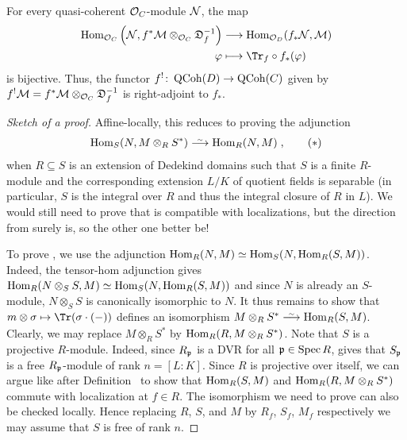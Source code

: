 \documentclass[a4paper,parskip=half,numbers=enddot, DIV=12]{scrreprt}
\begin{document}
\begin{prop}
	For every quasi-coherent $\mathcal{O}_C$-module $\mathcal{N}$, the map
	\begin{align}\lbl{eq:f^!adjunction}
		\begin{split}
			\Hom_{\Oo_C}\left(\Nn,f^*\Mm\otimes_{\Oo_C}\DD_f^{-1}\right)&\morphism\Hom_{\Oo_D}(f_*\Nn,\Mm)\\
			\phi&\longmapsto\Tr_f\circ f_*(\phi)
		\end{split}
	\end{align}
	is bijective. Thus, the functor $f^!\colon\cat{QCoh}(D)\morphism\cat{QCoh}(C)$ given by $f^!\mathcal{M}=f^*\mathcal{M}\otimes_{\mathcal{O}_C}\mathfrak{D}_f^{-1}$ is right-adjoint to $f_*$.
\end{prop}
\begin{proof}[Sketch of a proof]
	Affine-locally, this reduces to proving the adjunction 
	\begin{align}\lbl{eq:localAdjunction}
		\Hom_S(N,M\otimes_RS^*)\isomorphism\Hom_R(N,M)\;,\tag{$*$}
	\end{align}
	when $R\subseteq S$ is an extension of Dedekind domains such that $S$ is a finite $R$-module and the corresponding extension $L/K$ of quotient fields is separable (in particular, $S$ is the integral over $R$ and thus the integral closure of $R$ in $L$). We would still need to prove that  is compatible with localizations, but the direction from  surely is, so the other one better be!
	
	To prove , we use the adjunction $\operatorname{Hom}_R(N,M)\simeq \operatorname{Hom}_S(N,\operatorname{Hom}_R(S,M))$. Indeed, the tensor-hom adjunction gives $\operatorname{Hom}_R(N\otimes_SS,M)\simeq \operatorname{Hom}_S(N,\operatorname{Hom}_R(S,M))$ and since $N$ is already an $S$-module, $N\otimes_SS$ is canonically isomorphic to $N$. It thus remains to show that $m\otimes \sigma\mapsto \Tr(\sigma\cdot (-))$ defines an isomorphism $M\otimes_RS^*\isomorphism\Hom_R(S,M)$. Clearly, we may replace $M\otimes_RS^*$ by $\operatorname{Hom}_R(R,M\otimes_RS^*)$. Note that $S$ is a projective $R$-module. Indeed, since $R_{\mathfrak{p}}$ is a DVR for all $\mathfrak{p}\in\operatorname{Spec} R$, \cite[Ch.~I, (2.10)]{NEUKIRCH} gives that $S_{\mathfrak{p}}$ is a free $R_{\mathfrak{p}}$-module of rank $n=[L:K]$. Since $R$ is projective over itself, we can argue like after Definition~ to show that $\operatorname{Hom}_R(S,M)$ and $\operatorname{Hom}_R(R,M\otimes_RS^*)$ commute with localization at $f\in R$. The isomorphism we need to prove can also be checked locally. Hence replacing $R$, $S$, and $M$ by $R_f$, $S_f$, $M_f$ respectively we may assume that $S$ is free of rank $n$. 
	

\end{proof}
\end{document}
